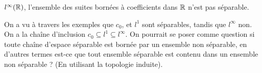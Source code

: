 \begin{exemple}
	$l^{\infty}(\mathbb{R})$, l'ensemble des suites bornées à coefficients dans
	$\mathbb{R}$ n'est pas séparable.
\end{exemple}

\begin{question}
	On a vu à travers les exemples que $c_{0}$, et $l^{1}$ sont séparables,
	tandis que $l^{\infty}$ non. On a la chaîne d'inclusion $c_{0} \subseteq
	l^{1} \subseteq l^{\infty}$.
	On pourrait se poser comme question si toute chaîne d'espace séparable
	est bornée par un ensemble non séparable, en d'autres termes est-ce que tout
	ensemble séparable est contenu dans un ensemble non séparable ? (En
	utilisant la topologie induite).
\end{question}
